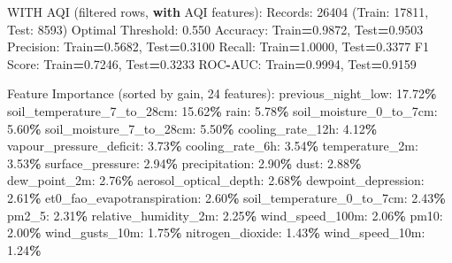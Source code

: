 \documentclass[
  letterpaper,
  DIV=11,
  numbers=noendperiod]{scrartcl}
\newenvironment{Shaded}{\begin{snugshade}}{\end{snugshade}}
\newcommand{\BuiltInTok}[1]{#1}
\newcommand{\ControlFlowTok}[1]{\textcolor[rgb]{0.13,0.29,0.53}{\textbf{#1}}}
\newcommand{\DecValTok}[1]{\textcolor[rgb]{0.00,0.00,0.81}{#1}}
\newcommand{\FloatTok}[1]{\textcolor[rgb]{0.00,0.00,0.81}{#1}}
\newcommand{\NormalTok}[1]{#1}
\newcommand{\OperatorTok}[1]{\textcolor[rgb]{0.81,0.36,0.00}{\textbf{#1}}}
\begin{document}
\begin{Shaded}
\begin{Highlighting}[]
\NormalTok{WITH AQI (filtered rows, }\ControlFlowTok{with}\NormalTok{ AQI features):}
\NormalTok{  Records: }\DecValTok{26404}\NormalTok{ (Train: }\DecValTok{17811}\NormalTok{, Test: }\DecValTok{8593}\NormalTok{)}
\NormalTok{  Optimal Threshold: }\FloatTok{0.550}
\NormalTok{  Accuracy: Train}\OperatorTok{=}\FloatTok{0.9872}\NormalTok{, Test}\OperatorTok{=}\FloatTok{0.9503}
\NormalTok{  Precision: Train}\OperatorTok{=}\FloatTok{0.5682}\NormalTok{, Test}\OperatorTok{=}\FloatTok{0.3100}
\NormalTok{  Recall: Train}\OperatorTok{=}\FloatTok{1.0000}\NormalTok{, Test}\OperatorTok{=}\FloatTok{0.3377}
\NormalTok{  F1 Score: Train}\OperatorTok{=}\FloatTok{0.7246}\NormalTok{, Test}\OperatorTok{=}\FloatTok{0.3233}
\NormalTok{  ROC}\OperatorTok{{-}}\NormalTok{AUC: Train}\OperatorTok{=}\FloatTok{0.9994}\NormalTok{, Test}\OperatorTok{=}\FloatTok{0.9159}

\NormalTok{  Feature Importance (}\BuiltInTok{sorted}\NormalTok{ by gain, }\DecValTok{24}\NormalTok{ features):}
\NormalTok{    previous\_night\_low: }\FloatTok{17.72}\OperatorTok{\%}
\NormalTok{    soil\_temperature\_7\_to\_28cm: }\FloatTok{15.62}\OperatorTok{\%}
\NormalTok{    rain: }\FloatTok{5.78}\OperatorTok{\%}
\NormalTok{    soil\_moisture\_0\_to\_7cm: }\FloatTok{5.60}\OperatorTok{\%}
\NormalTok{    soil\_moisture\_7\_to\_28cm: }\FloatTok{5.50}\OperatorTok{\%}
\NormalTok{    cooling\_rate\_12h: }\FloatTok{4.12}\OperatorTok{\%}
\NormalTok{    vapour\_pressure\_deficit: }\FloatTok{3.73}\OperatorTok{\%}
\NormalTok{    cooling\_rate\_6h: }\FloatTok{3.54}\OperatorTok{\%}
\NormalTok{    temperature\_2m: }\FloatTok{3.53}\OperatorTok{\%}
\NormalTok{    surface\_pressure: }\FloatTok{2.94}\OperatorTok{\%}
\NormalTok{    precipitation: }\FloatTok{2.90}\OperatorTok{\%}
\NormalTok{    dust: }\FloatTok{2.88}\OperatorTok{\%}
\NormalTok{    dew\_point\_2m: }\FloatTok{2.76}\OperatorTok{\%}
\NormalTok{    aerosol\_optical\_depth: }\FloatTok{2.68}\OperatorTok{\%}
\NormalTok{    dewpoint\_depression: }\FloatTok{2.61}\OperatorTok{\%}
\NormalTok{    et0\_fao\_evapotranspiration: }\FloatTok{2.60}\OperatorTok{\%}
\NormalTok{    soil\_temperature\_0\_to\_7cm: }\FloatTok{2.43}\OperatorTok{\%}
\NormalTok{    pm2\_5: }\FloatTok{2.31}\OperatorTok{\%}
\NormalTok{    relative\_humidity\_2m: }\FloatTok{2.25}\OperatorTok{\%}
\NormalTok{    wind\_speed\_100m: }\FloatTok{2.06}\OperatorTok{\%}
\NormalTok{    pm10: }\FloatTok{2.00}\OperatorTok{\%}
\NormalTok{    wind\_gusts\_10m: }\FloatTok{1.75}\OperatorTok{\%}
\NormalTok{    nitrogen\_dioxide: }\FloatTok{1.43}\OperatorTok{\%}
\NormalTok{    wind\_speed\_10m: }\FloatTok{1.24}\OperatorTok{\%}


\end{Highlighting}
\end{Shaded}
\end{document}
